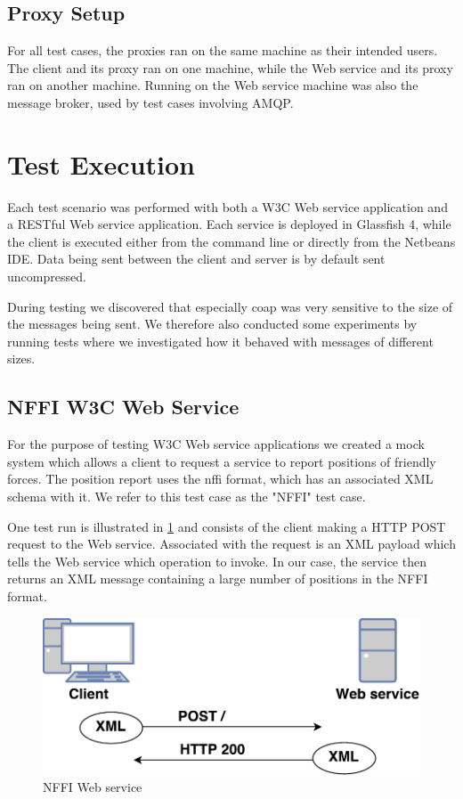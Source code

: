 \subsection{Proxy Setup}

For all test cases, the proxies ran on the same machine as their intended users.
The client and its proxy ran on one machine, while the Web service and its proxy
ran on another machine. Running on the Web service machine was also the message
broker, used by test cases involving AMQP.

\section{Test Execution}

 Each test scenario was performed with both a W3C Web service application and a
 RESTful Web service application. Each service is deployed in Glassfish 4, while
 the client is executed either from the command line or directly from the
 Netbeans IDE. Data being sent between the client and server is by default sent
 uncompressed.

During testing we discovered that especially \gls{coap} was very sensitive to
the size of the messages being sent. We therefore also conducted some
experiments by running tests where we investigated how it behaved with messages
of different sizes.

\subsection{NFFI W3C Web Service}

For the purpose of testing W3C Web service applications we created a mock system
which allows a client to request a service to report positions of friendly
forces. The position report uses the \gls{nffi} format, which has an associated
XML schema with it. We refer to this test case as the "NFFI" test case.

One test run is illustrated in \cref{figure-nffi-flow} and consists of the
client making a HTTP POST request to the Web service. Associated with the
request is an XML payload which tells the Web service which operation to invoke.
In our case, the service then returns an XML message containing a large number
of positions in the NFFI format.

\begin{figure}[h]
\centering
\includegraphics[scale=0.6]{images/nffi_flow.pdf}
\caption{NFFI Web service}
\label{figure-nffi-flow}
\end{figure}

